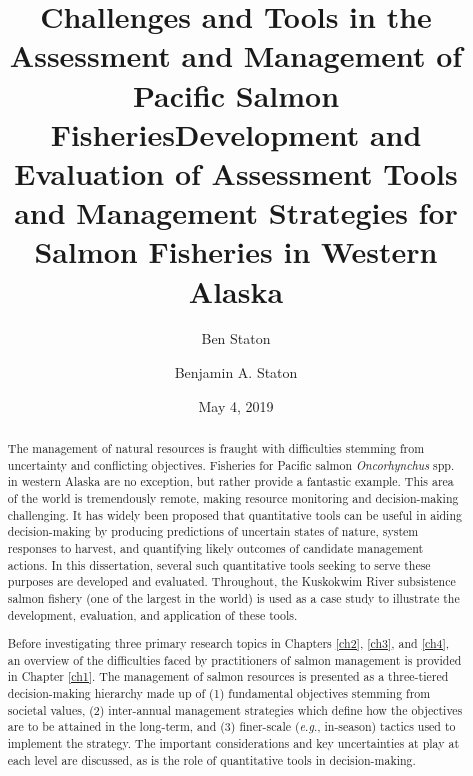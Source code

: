 \documentclass[12pt,]{book}
\title{Challenges and Tools in the Assessment and Management of Pacific Salmon
Fisheries}
\author{Ben Staton}
\date{}
\title{Development and Evaluation of Assessment Tools and Management Strategies for Salmon Fisheries in Western Alaska}
\author{Benjamin A. Staton}
\date{May 4, 2019} %
\theoremstyle{definition}
\theoremstyle{definition}
\theoremstyle{definition}
\theoremstyle{remark}
\begin{document}
\maketitle

\begin{romanpages}      %

\TitlePage 

\doublespacing
\setlength{\parskip}{0pt plus 0pt minus 0pt}

\begin{abstract} 
\noindent
The management of natural resources is fraught with difficulties stemming from uncertainty and conflicting objectives. Fisheries for Pacific salmon \textit{Oncorhynchus} spp. in western Alaska are no exception, but rather provide a fantastic example. This area of the world is tremendously remote, making resource monitoring and decision-making challenging. It has widely been proposed that quantitative tools can be useful in aiding decision-making by producing predictions of uncertain states of nature, system responses to harvest, and quantifying likely outcomes of candidate management actions. In this dissertation, several such quantitative tools seeking to serve these purposes are developed and evaluated. Throughout, the Kuskokwim River subsistence salmon fishery (one of the largest in the world) is used as a case study to illustrate the development, evaluation, and application of these tools.

Before investigating three primary research topics in Chapters \ref{ch2}, \ref{ch3}, and \ref{ch4}, an overview of the difficulties faced by practitioners of salmon management is provided in Chapter \ref{ch1}. The management of salmon resources is presented as a three-tiered decision-making hierarchy made up of (1) fundamental objectives stemming from societal values, (2) inter-annual management strategies which define how the objectives are to be attained in the long-term, and (3) finer-scale (\textit{e}.\textit{g}., in-season) tactics used to implement the strategy. The important considerations and key uncertainties at play at each level are discussed, as is the role of quantitative tools in decision-making.


\end{abstract}
\end{romanpages}
\end{document}
